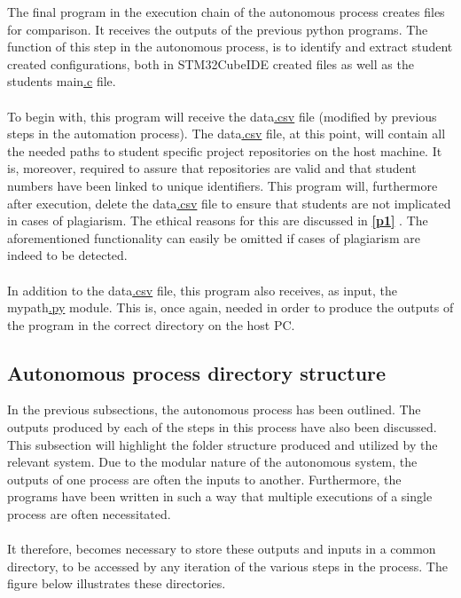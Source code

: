 The final program in the execution chain of the autonomous process creates files for comparison. It receives the outputs of the previous python programs. The function of this step in the autonomous process, is to identify and extract student created configurations, both in STM32CubeIDE created files as well as the students main\hyperref[listAbr]{.c} file.
\\\\
To begin with, this program will receive the data\hyperref[listExt]{.csv} file (modified by previous steps in the automation process). The data\hyperref[listExt]{.csv} file, at this point, will contain all the needed paths to student specific project repositories on the host machine. It is, moreover, required to assure that repositories are valid and that student numbers have been linked to unique identifiers. This program will, furthermore after execution, delete the data\hyperref[listExt]{.csv} file to ensure that students are not implicated in cases of plagiarism. The ethical reasons for this are discussed in \textbf{\ref{p1} }. The aforementioned functionality can easily be omitted if cases of plagiarism are indeed to be detected. 
\\\\
In addition to the data\hyperref[listExt]{.csv} file, this program also receives, as input, the mypath\hyperref[listExt]{.py} module. This is, once again, needed in order to produce the outputs of the program in the correct directory on the host PC.

\subsection{Autonomous process directory structure}
\label{p4}
In the previous subsections, the autonomous process has been outlined. The outputs produced by each of the steps in this process have also been discussed. This subsection will highlight the folder structure produced and utilized by the relevant system. Due to the modular nature of the autonomous system, the outputs of one process are often the inputs to another. Furthermore, the programs have been written in such a way that multiple executions of a single process are often necessitated.
\\\\
It therefore, becomes necessary to store these outputs and inputs in a common directory, to be accessed by any iteration of the various steps in the process. The figure below illustrates these directories.

